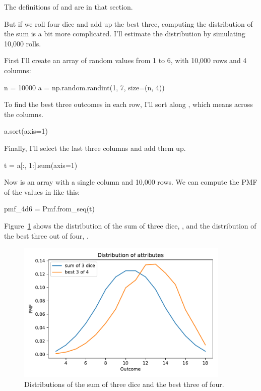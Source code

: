 \documentclass[12pt]{book}
\theoremstyle{exercise}
\begin{document}
The definitions of  and  are in that section.

But if we roll four dice and add up the best three, computing the distribution of the sum is a bit more complicated.
I'll estimate the distribution by simulating 10,000 rolls.

First I'll create an array of random values from 1 to 6, with 10,000 rows and 4 columns:

\begin{code}
n = 10000
a = np.random.randint(1, 7, size=(n, 4))
\end{code}

To find the best three outcomes in each row, I'll sort along , which means across the columns.

\begin{code}
a.sort(axis=1)
\end{code}

Finally, I'll select the last three columns and add them up.

\begin{code}
t = a[:, 1:].sum(axis=1)
\end{code}

Now  is an array with a single column and 10,000 rows.
We can compute the PMF of the values in  like this:

\begin{code}
pmf_4d6 = Pmf.from_seq(t)
\end{code}

Figure~\ref{fig06-02} shows the distribution of the sum of three dice, , and the distribution of the best three out of four, .

\begin{figure}
\centerline{\includegraphics[width=4in]{figs/fig06-02.pdf}}
\caption{Distributions of the sum of three dice and the best three of four.}
\label{fig06-02}
\end{figure}
\end{document}
